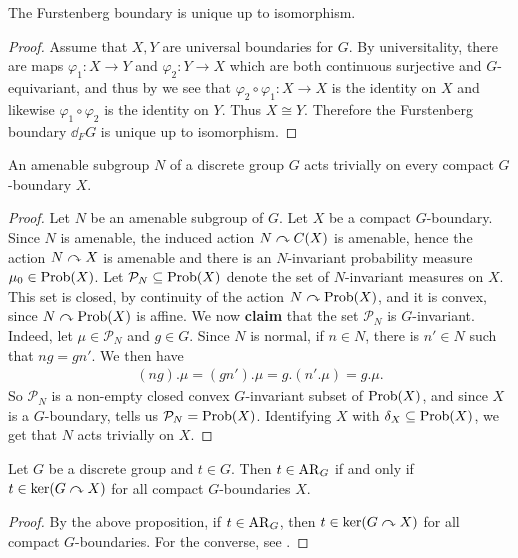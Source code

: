 \begin{proposition}\label{uniqueness of fursten}
The Furstenberg boundary is unique up to isomorphism.
\begin{proof}
Assume that $X,Y$ are universal boundaries for $G$. By universitality, there are maps $\varphi_1 \colon X \to Y$ and $\varphi_2 \colon Y \to X$ which are both continuous surjective and $G$-equivariant, and thus by  we see that $\varphi_2 \circ \varphi_1 \colon X \to X$ is the identity on $X$ and likewise $\varphi_1 \circ \varphi_2$ is the identity on $Y$. Thus $X \cong Y$. Therefore the Furstenberg boundary $\dd_F G$ is unique up to isomorphism.
\end{proof}
\end{proposition}

\begin{proposition}
An amenable subgroup $N$ of a discrete group $G$ acts trivially on every compact $G$-boundary $X$.
\begin{proof}
Let $N$ be an amenable subgroup of $G$. Let $X$ be a compact $G$-boundary. Since $N$ is amenable, the induced action $N \curvearrowright C(X)$ is amenable, hence the action $N \curvearrowright X$ is amenable and there is an $N$-invariant probability measure $\mu_0 \in \operatorname{Prob}(X)$. Let $\mathcal{P}_N \subseteq \operatorname{Prob}(X)$ denote the set of $N$-invariant measures on $X$. This set is closed, by continuity of the action $N \curvearrowright \operatorname{Prob}(X)$, and it is convex, since $N \curvearrowright \operatorname{Prob}(X)$ is affine. We now \textbf{claim} that the set $\mathcal{P}_N$ is $G$-invariant. Indeed, let $\mu \in \mathcal{P}_N$ and $g \in G$. Since $N$ is normal, if $n \in N$, there is $n' \in N$ such that $ng=gn'$. We then have
\begin{align*}
(ng).\mu=(gn').\mu=g.(n'.\mu)=g.\mu.
\end{align*}
So $\mathcal{P}_N$ is a non-empty closed convex $G$-invariant subset of $\operatorname{Prob}(X)$, and since $X$ is a $G$-boundary,  tells us $\mathcal{P}_N=\operatorname{Prob}(X)$. Identifying $X$ with $\delta_{X}\subseteq \operatorname{Prob}(X)$, we get that $N$ acts trivially on $X$.
\end{proof}
\end{proposition}

\begin{proposition}\label{furman}
Let $G$ be a discrete group and $t \in G$. Then $t \in \operatorname{AR}_G$ if and only if $t \in \ker(G \curvearrowright X)$ for all compact $G$-boundaries $X$.
\begin{proof}
By the above proposition, if $t \in \operatorname{AR}_G$, then $t \in \ker(G \curvearrowright X)$ for all compact $G$-boundaries. For the converse, see \cite[Proposition 7][179]{furman2003minimal}.
\end{proof}
\end{proposition}

